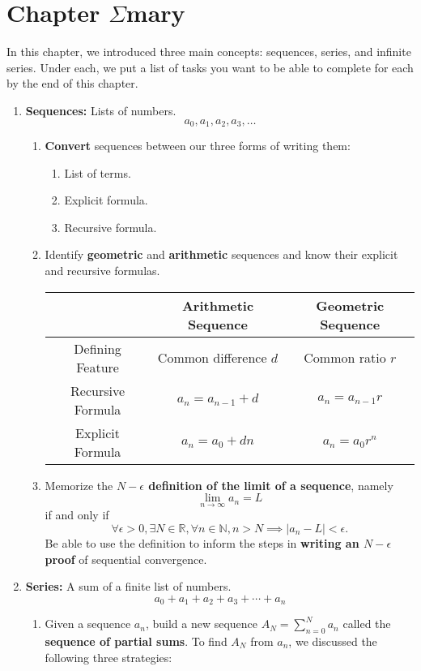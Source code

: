 \section{Chapter $\Sigma$mary}
In this chapter, we introduced three main concepts: sequences, series, and infinite series.  Under each, we put a list of tasks you want to be able to complete for each by the end of this chapter.
\begin{enumerate}
\item {\bf Sequences:} Lists of numbers. $$a_0,a_1,a_2,a_3,\ldots $$
\begin{enumerate}
\item {\bf Convert} sequences between our three forms of writing them:
\begin{enumerate}
\item List of terms.
\item Explicit formula.
\item Recursive formula.
\end{enumerate}
\item Identify {\bf geometric} and {\bf arithmetic} sequences and know their explicit and recursive formulas.
\begin{center}
\begin{tabular}{|c|c|c|} \hline 
& Arithmetic Sequence & Geometric Sequence \\ \hline
Defining Feature & Common difference $d$ & Common ratio $r$ \\ 
Recursive Formula & $a_n=a_{n-1}+d$ &$a_n=a_{n-1}r$ \\
Explicit Formula & $a_n=a_0+dn$ &$a_n=a_{0}r^n$ \\ \hline
\end{tabular}
\end{center}
\item Memorize the {\bf $N-\epsilon$ definition of the limit of a sequence}, namely $$\lim_{n \rightarrow \infty }a_n=L $$ if and only if$$\forall\epsilon>0, \exists N \in \mathbb{R}, \forall n\in \mathbb{N}, n>N \implies \left| a_n-L\right|<\epsilon.$$  Be able to use the definition to inform the steps in {\bf writing an $N-\epsilon$ proof} of sequential convergence.
\end{enumerate}
\item {\bf Series:} A sum of a finite list of numbers. $$a_0+a_1+a_2+a_3+\cdots +a_n $$
\begin{enumerate}
\item Given a sequence $a_n$, build a new sequence $A_N=\sum_{n=0}^Na_n$ called the {\bf sequence of partial sums}.  To find $A_N$ from $a_n$, we discussed the following three strategies:

\end{enumerate}
\end{enumerate}

